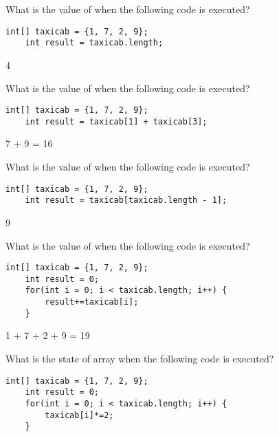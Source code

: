 \begin{questions}

\question What is the value of  when the following code is executed?

\begin{lstlisting}[basicstyle=\large]
	int[] taxicab = {1, 7, 2, 9};
	int result = taxicab.length;
\end{lstlisting}

\begin{solution}
4
\end{solution}

\question What is the value of  when the following code is executed?

\begin{lstlisting}[basicstyle=\large]
	int[] taxicab = {1, 7, 2, 9};
	int result = taxicab[1] + taxicab[3];
\end{lstlisting}

\begin{solution}
7 + 9 = 16	
\end{solution}

\question What is the value of  when the following code is executed?

\begin{lstlisting}[basicstyle=\large]
	int[] taxicab = {1, 7, 2, 9};
	int result = taxicab[taxicab.length - 1];
\end{lstlisting}

\begin{solution}
9
\end{solution}

\question What is the value of  when the following code is executed?

\begin{lstlisting}[basicstyle=\large]
	int[] taxicab = {1, 7, 2, 9};
	int result = 0;
	for(int i = 0; i < taxicab.length; i++) {
		result+=taxicab[i];
	}
\end{lstlisting}

\begin{solution}
1 + 7 + 2 + 9 = 19
\end{solution}

\question What is the state of array  when the following code is executed?

\begin{lstlisting}[basicstyle=\large]
	int[] taxicab = {1, 7, 2, 9};
	int result = 0;
	for(int i = 0; i < taxicab.length; i++) {
		taxicab[i]*=2;
	}
\end{lstlisting}


\end{questions}
